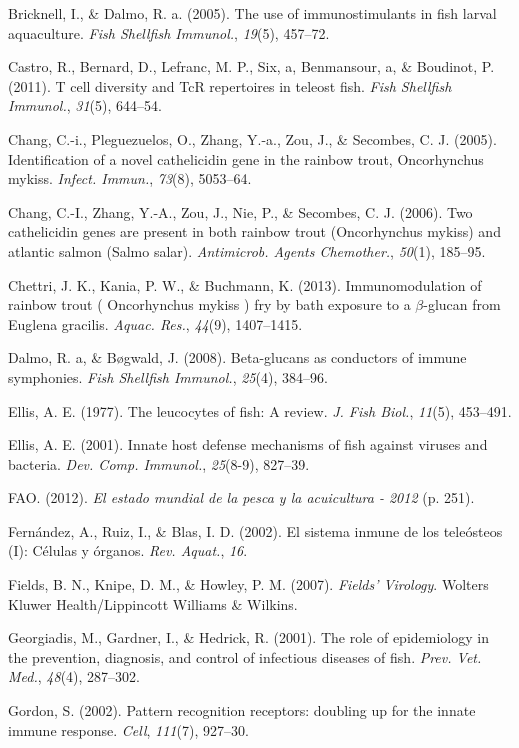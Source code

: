 \documentclass[12pt,a4paper,oneside]{scrbook}
\begin{document}
Bricknell, I., \& Dalmo, R. a. (2005). The use of immunostimulants in
fish larval aquaculture. \emph{Fish Shellfish Immunol.}, \emph{19}(5),
457--72.

Castro, R., Bernard, D., Lefranc, M. P., Six, a, Benmansour, a, \&
Boudinot, P. (2011). T cell diversity and TcR repertoires in teleost
fish. \emph{Fish Shellfish Immunol.}, \emph{31}(5), 644--54.

Chang, C.-i., Pleguezuelos, O., Zhang, Y.-a., Zou, J., \& Secombes, C.
J. (2005). Identification of a novel cathelicidin gene in the rainbow
trout, Oncorhynchus mykiss. \emph{Infect. Immun.}, \emph{73}(8),
5053--64.

Chang, C.-I., Zhang, Y.-A., Zou, J., Nie, P., \& Secombes, C. J. (2006).
Two cathelicidin genes are present in both rainbow trout (Oncorhynchus
mykiss) and atlantic salmon (Salmo salar). \emph{Antimicrob. Agents
Chemother.}, \emph{50}(1), 185--95.

Chettri, J. K., Kania, P. W., \& Buchmann, K. (2013). Immunomodulation
of rainbow trout ( Oncorhynchus mykiss ) fry by bath exposure to a
$\beta$-glucan from Euglena gracilis. \emph{Aquac. Res.}, \emph{44}(9),
1407--1415.

Dalmo, R. a, \& Bøgwald, J. (2008). Beta-glucans as conductors of immune
symphonies. \emph{Fish Shellfish Immunol.}, \emph{25}(4), 384--96.

Ellis, A. E. (1977). The leucocytes of fish: A review. \emph{J. Fish
Biol.}, \emph{11}(5), 453--491.

Ellis, A. E. (2001). Innate host defense mechanisms of fish against
viruses and bacteria. \emph{Dev. Comp. Immunol.}, \emph{25}(8-9),
827--39.

FAO. (2012). \emph{El estado mundial de la pesca y la acuicultura -
2012} (p. 251).

Fernández, A., Ruiz, I., \& Blas, I. D. (2002). El sistema inmune de los
teleósteos (I): Células y órganos. \emph{Rev. Aquat.}, \emph{16}.

Fields, B. N., Knipe, D. M., \& Howley, P. M. (2007). \emph{Fields'
Virology}. Wolters Kluwer Health/Lippincott Williams \& Wilkins.

Georgiadis, M., Gardner, I., \& Hedrick, R. (2001). The role of
epidemiology in the prevention, diagnosis, and control of infectious
diseases of fish. \emph{Prev. Vet. Med.}, \emph{48}(4), 287--302.

Gordon, S. (2002). Pattern recognition receptors: doubling up for the
innate immune response. \emph{Cell}, \emph{111}(7), 927--30.
\end{document}
